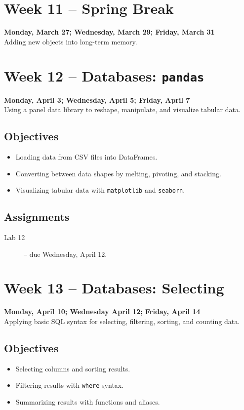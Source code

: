 \documentclass[10pt]{memoir}
\begin{document}
\section{Week 11 -- Spring Break}
\textcolor{CUGold}{\textbf{Monday, March 27; Wednesday, March 29; Friday, March 31}}\\
Adding new objects into long-term memory.

\section{Week 12 -- Databases: \texttt{pandas}}
\textcolor{CUGold}{\textbf{Monday, April 3; Wednesday, April 5; Friday, April 7}}\\
Using a panel data library to reshape, manipulate, and visualize tabular data.

    \subsection{Objectives}
    \begin{itemize}
        \item Loading data from CSV files into DataFrames.
        \item Converting between data shapes by melting, pivoting, and stacking.
        \item Visualizing tabular data with \texttt{matplotlib} and \texttt{seaborn}.
    \end{itemize}

    \subsection{Assignments}
    \begin{description}
        \item[Lab 12 ] -- due Wednesday, April 12.
    \end{description}
    
\section{Week 13 -- Databases: Selecting}
\textcolor{CUGold}{\textbf{Monday, April 10; Wednesday April 12; Friday, April 14}}\\
Applying basic SQL syntax for selecting, filtering, sorting, and counting data.

    \subsection{Objectives}
    \begin{itemize}
        \item Selecting columns and sorting results.
        \item Filtering results with \texttt{where} syntax.
        \item Summarizing results with functions and aliases.
    \end{itemize}
\end{document}
